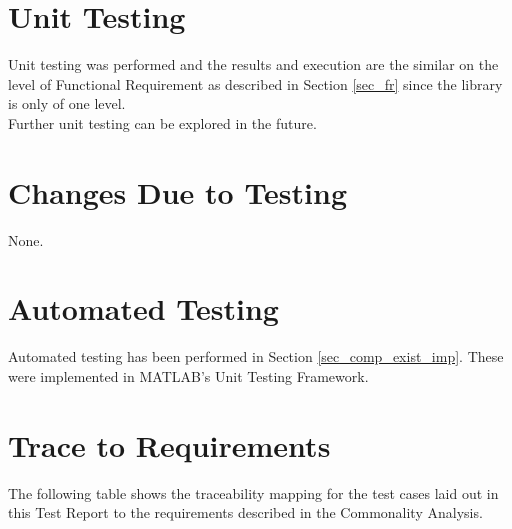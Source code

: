 \documentclass[12pt, titlepage]{article}
\begin{document}
\section{Unit Testing} \label{sec_ut}
Unit testing was performed and the results and execution are the similar
on the level of Functional Requirement as described in Section \ref{sec_fr}
since the library is only of one level.\\

Further unit testing can be explored in the future.

\section{Changes Due to Testing} \label{sec_changes}

None.

\section{Automated Testing} \label{sec_at}

Automated testing has been performed in Section \ref{sec_comp_exist_imp}.
These were implemented in MATLAB's Unit Testing Framework.
		
\section{Trace to Requirements} \label{sec_trace_req}

The following table shows the traceability mapping for the test cases laid out in this Test Report to the requirements 
described in the Commonality Analysis.
\end{document}
